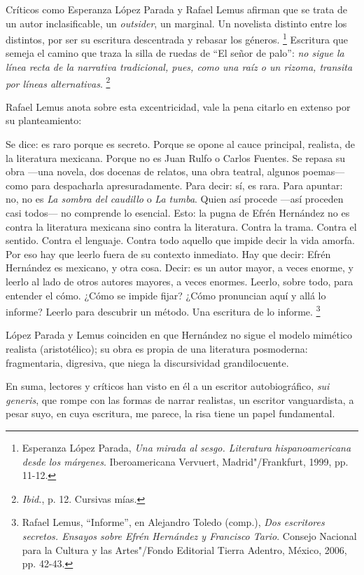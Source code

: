 \documentclass[14pt,twoside,final]{extbook} %
\let\oldfootnote\footnote
\renewcommand\footnote[1]{%
\oldfootnote{\hspace{1mm}#1}}
\begin{document}
Críticos como Esperanza López Parada y Rafael Lemus afirman que se trata de un autor inclasificable, un \emph{outsider}, un marginal. Un novelista distinto entre los distintos, por ser su escritura descentrada y rebasar los géneros.\footnote{Esperanza López Parada, \emph{Una mirada al sesgo. Literatura hispanoamericana desde los márgenes}. Iberoamericana Vervuert, Madrid"/Frankfurt, 1999, pp. 11-12.} Escritura que semeja el camino que traza la silla de ruedas de ``El señor de palo'': \emph{no sigue la línea recta de la narrativa tradicional, pues, como una raíz o un rizoma, transita por líneas alternativas}.\footnote{\emph{Ibid.}, p. 12. Cursivas mías.}

Rafael Lemus anota sobre esta excentricidad, vale la pena citarlo en extenso por su planteamiento:\protect\enlargethispage*{\baselineskip}
\begin{quoting}
Se dice: es raro porque es secreto. Porque se opone al cauce principal, realista, de la literatura mexicana. Porque no es Juan Rulfo o Carlos Fuentes. Se repasa su obra ---una novela, dos docenas de
relatos, una obra teatral, algunos poemas--- como para despacharla apresuradamente. Para decir: sí, es rara. Para apuntar: no, no es \emph{La sombra del caudillo} o \emph{La tumba}. Quien así procede ---así proceden casi todos--- no comprende lo esencial. Esto: la pugna de Efrén Hernández no es contra la literatura mexicana sino contra la literatura. Contra la trama. Contra el sentido. Contra el lenguaje. Contra todo aquello que impide decir la vida amorfa. Por eso hay que leerlo fuera de su contexto inmediato. Hay que decir: Efrén Hernández es mexicano, y otra cosa. Decir: es un autor mayor, a veces enorme, y leerlo al lado de otros autores mayores, a veces enormes. Leerlo, sobre todo, para entender el cómo. ¿Cómo se impide fijar? ¿Cómo pronuncian aquí y allá lo informe? Leerlo para descubrir un método. Una escritura de lo informe.\footnote{Rafael Lemus, ``Informe'', en Alejandro Toledo (comp.), \emph{Dos escritores secretos. Ensayos sobre Efrén Hernández y Francisco Tario}. Consejo Nacional para la Cultura y las Artes"/Fondo Editorial Tierra Adentro, México, 2006, pp. 42-43.}
\end{quoting}
López Parada y Lemus coinciden en que Hernández no sigue el modelo mimético realista (aristotélico); su obra es propia de una literatura posmoderna: fragmentaria, digresiva, que niega la discursividad grandilocuente.

En suma, lectores y críticos han visto en él a un escritor autobiográfico, \emph{sui generis}, que rompe con las formas de narrar realistas, un escritor vanguardista, a pesar suyo, en cuya escritura, me parece, la risa tiene un papel fundamental.
\end{document}
